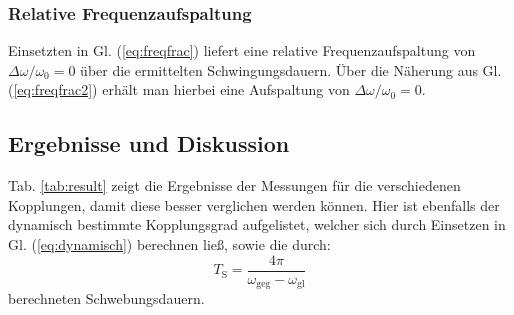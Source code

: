 \documentclass[11pt,a4paper,titlepage, ngerman]{article}
\newcommand{\refeq}[1]{Gl. (\ref{eq:#1})}
\newcommand{\reftab}[1]{Tab. \ref{tab:#1}}
\begin{document}
			\subsubsection{Relative Frequenzaufspaltung}
			
				Einsetzten in \refeq{freqfrac} liefert eine relative Frequenzaufspaltung von $\Delta\omega / \omega_0 = 0$ über die ermittelten Schwingungsdauern. Über die Näherung aus \refeq{freqfrac2} erhält man hierbei eine Aufspaltung von $\Delta\omega / \omega_0 = 0$.
																
		\subsection{Ergebnisse und Diskussion}	
			
			\reftab{result} zeigt die Ergebnisse der Messungen für die verschiedenen Kopplungen, damit diese besser verglichen werden können. Hier ist ebenfalls der dynamisch bestimmte Kopplungsgrad aufgelistet, welcher sich durch Einsetzen in \refeq{dynamisch} berechnen ließ, sowie die durch:
			\begin{equation}
				T_\text{S} = \frac{4\pi}{\omega_\text{geg} - \omega_\text{gl}} 
			\end{equation}
			berechneten Schwebungsdauern.
\end{document}
